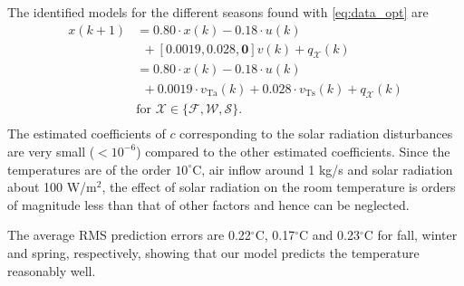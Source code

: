 The identified models for the different seasons found with \eqref{eq:data_opt} are
\begin{equation}\label{eq:lumped_zone_res}
\begin{aligned}
x(k+1) & = 0.80\cdot x(k) - 0.18\cdot u(k) \\
 & ~~ + \left[0.0019, 0.028, \mathbf{0} \right] v(k) + q_{\mathcal{X}}(k) \\
 & =  0.80\cdot x(k) - 0.18\cdot u(k) \\
 & ~~ + 0.0019 \cdot v_{\text{Ta}}(k) + 0.028 \cdot v_{\text{Ts}}(k) + q_{\mathcal{X}}(k) \\
 & \text{for } \mathcal{X} \in \lbrace \mathcal{F}, \mathcal{W}, \mathcal{S} \rbrace.\\
\end{aligned}
\end{equation}
The estimated coefficients of $c$ corresponding to the solar radiation disturbances are very small ($< 10^{-6}$) compared to the other estimated coefficients. Since the temperatures are of the order $10^{\circ}$C, air inflow around 1 kg/s and solar radiation about 100 W/m$^2$, the effect of solar radiation on the room temperature is orders of magnitude less than that of other factors and hence can be neglected.

The average RMS prediction errors are 0.22$^{\circ}$C, 0.17$^{\circ}$C and 0.23$^{\circ}$C for fall, winter and spring, respectively, showing that our model predicts the temperature reasonably well. 



